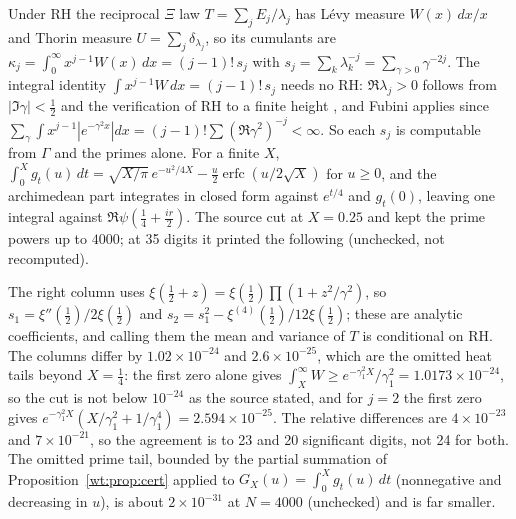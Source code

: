 Under RH the reciprocal $\Xi$ law $T=\sum_jE_j/\lambda_j$ has L\'evy measure $W(x)\,dx/x$ and Thorin measure $U=\sum_j\delta_{\lambda_j}$, so its cumulants are $\kappa_j=\int_0^\infty x^{j-1}W(x)\,dx=(j-1)!\,s_j$ with $s_j=\sum_k\lambda_k^{-j}=\sum_{\gamma>0}\gamma^{-2j}$. The integral identity $\int x^{j-1}W\,dx=(j-1)!\,s_j$ needs no RH: $\Re\lambda_j>0$ follows from $|\Im\gamma|<\frac12$ and the verification of RH to a finite height \cite{PT21}, and Fubini applies since $\sum_\gamma\int x^{j-1}|e^{-\gamma^2x}|dx=(j-1)!\sum(\Re\gamma^2)^{-j}<\infty$. So each $s_j$ is computable from $\Gamma$ and the primes alone. For a finite $X$, $\int_0^Xg_t(u)\,dt=\sqrt{X/\pi}\,e^{-u^2/4X}-\frac u2\operatorname{erfc}(u/2\sqrt X)$ for $u\ge0$, and the archimedean part integrates in closed form against $e^{t/4}$ and $g_t(0)$, leaving one integral against $\Re\psi(\frac14+\frac{ir}2)$. The source cut at $X=0.25$ and kept the prime powers up to $4000$; at 35 digits it printed the following (unchecked, not recomputed).
\begin{center}\small
{}
\end{center}
The right column uses $\xi(\frac12+z)=\xi(\frac12)\prod(1+z^2/\gamma^2)$, so $s_1=\xi''(\frac12)/2\xi(\frac12)$ and $s_2=s_1^2-\xi^{(4)}(\frac12)/12\xi(\frac12)$; these are analytic coefficients, and calling them the mean and variance of $T$ is conditional on RH. The columns differ by $1.02\times10^{-24}$ and $2.6\times10^{-25}$, which are the omitted heat tails beyond $X=\frac14$: the first zero alone gives $\int_X^\infty W\ge e^{-\gamma_1^2X}/\gamma_1^2=1.0173\times10^{-24}$, so the cut is not below $10^{-24}$ as the source stated, and for $j=2$ the first zero gives $e^{-\gamma_1^2X}(X/\gamma_1^2+1/\gamma_1^4)=2.594\times10^{-25}$. The relative differences are $4\times10^{-23}$ and $7\times10^{-21}$, so the agreement is to 23 and 20 significant digits, not 24 for both. The omitted prime tail, bounded by the partial summation of Proposition~\ref{wt:prop:cert} applied to $G_X(u)=\int_0^Xg_t(u)\,dt$ (nonnegative and decreasing in $u$), is about $2\times10^{-31}$ at $N=4000$ (unchecked) and is far smaller.

